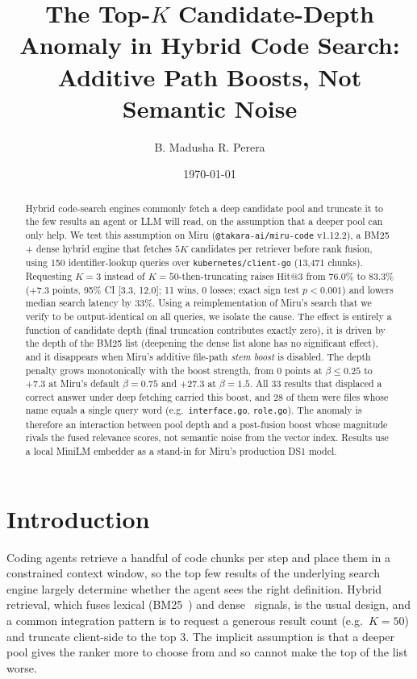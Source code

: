 \documentclass[11pt, letterpaper]{article}
\title{\textbf{The Top-$K$ Candidate-Depth Anomaly in Hybrid Code Search:\\Additive Path Boosts, Not Semantic Noise}}
\author{B. Madusha R. Perera\\ \href{https://github.com/maduperera/Miru_}{\code{github.com/maduperera/Miru\_}}}
\date{\today}
\makeatletter
\newcommand{\hit}{\mathrm{Hit@3}}
\newcommand{\code}[1]{\texttt{#1}}
\makeatother
\begin{document}
\maketitle

\begin{abstract}
Hybrid code-search engines commonly fetch a deep candidate pool and truncate it to the few results an agent or
LLM will read, on the assumption that a deeper pool can only help. We test this assumption on Miru
(\code{@takara-ai/miru-code} v1.12.2), a BM25 + dense hybrid engine that fetches $5K$ candidates per retriever before
rank fusion, using 150 identifier-lookup queries over \code{kubernetes/client-go} (13{,}471 chunks). Requesting
$K{=}3$ instead of $K{=}50$-then-truncating raises $\hit$ from 76.0\% to 83.3\% (+7.3 points, 95\% CI [3.3, 12.0];
11 wins, 0 losses; exact sign test $p<0.001$) and lowers median search latency by 33\%. Using a reimplementation of
Miru's search that we verify to be output-identical on all queries, we isolate the cause. The effect is entirely a
function of candidate depth (final truncation contributes exactly zero), it is driven by the depth of the BM25 list
(deepening the dense list alone has no significant effect), and it disappears when Miru's additive file-path
\emph{stem boost} is disabled. The depth penalty grows monotonically with the boost strength, from 0 points at
$\beta\le0.25$ to +7.3 at Miru's default $\beta{=}0.75$ and +27.3 at $\beta{=}1.5$. All 33 results that displaced a
correct answer under deep fetching carried this boost, and 28 of them were files whose name equals a single query
word (e.g.\ \code{interface.go}, \code{role.go}). The anomaly is therefore an interaction between pool depth and a
post-fusion boost whose magnitude rivals the fused relevance scores, not semantic noise from the vector index.
Results use a local MiniLM embedder as a stand-in for Miru's production DS1 model.
\end{abstract}

\section{Introduction}
Coding agents retrieve a handful of code chunks per step and place them in a constrained context window, so the
top few results of the underlying search engine largely determine whether the agent sees the right definition.
Hybrid retrieval, which fuses lexical (BM25~\cite{robertson2009bm25}) and dense~\cite{reimers2019sbert} signals, is
the usual design, and a common integration pattern is to request a generous result count (e.g.\ $K{=}50$) and
truncate client-side to the top 3. The implicit assumption is that a deeper pool gives the ranker more to choose from
and so cannot make the top of the list worse.
\end{document}
